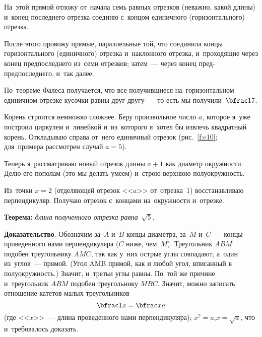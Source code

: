 На~этой прямой отложу от~начала семь равных отрезков (неважно, какой длины) и~конец последнего
отрезка соединю с~концом единичного (горизонтального) отрезка.

После этого провожу прямые, параллельные той, что соединила концы горизонтального (единичного)
отрезка и~наклонного отрезка, и~проходящие через конец предпоследнего из~семи отрезков; затем~---
через конец пред-предпоследнего, и~так далее.

По~теореме Фалеса получается, что все получившиеся на~горизонтальном единичном отрезке кусочки
равны друг другу~--- то есть мы получили~$\bfrac17$.

Корень строится немножко сложнее. Беру произвольное число $a$, которое я~уже построил циркулем
и~линейкой и~из~которого я~хотел бы извлечь квадратный корень. Откладываю справа от~него единичный
отрезок (рис.~\ref{f:e10}; для~примера рассмотрен случай $a=5$).


Теперь я~рассматриваю новый отрезок длины $a+1$ как диаметр окружности. Делю его пополам (это мы
делать умеем) и~строю верхнюю полуокружность.

Из~точки $x=2$ (отделяющей отрезок <<$a$>> от~отрезка~1) восстанавливаю перпендикуляр. Получаю отрезок
с~концами на~окружности и~отрезке.

\textbf{Теорема:} \textit{длина полученного отрезка равна~$\sqrt5$}.

\textbf{Доказательство}. Обозначим за~$A$ и~$B$ концы диаметра, за~$M$ и~$C$~--- концы проведенного нами
перпендикуляра ($C$ ниже, чем~$M$). Треугольник $ABM$ подобен треугольнику $AMC$, так как у~них острые углы совпадают,
а~один из~углов~--- прямой. (Угол AMB прямой, как и любой угол, вписанный в полуокружность.)
 Значит, и~третьи углы равны. По~той же причине и~треугольник $ABM$ подобен треугольнику
$MBC$.
 Значит, можно записать отношение катетов малых треугольников
$$
\bfrac1x=\bfrac xa
$$
(где <<$x$>>~--- длина проведенного нами перпендикуляра); $x^{2}=a$,\linebreak $x=\sqrt{a}$,
что и~требовалось доказать.


